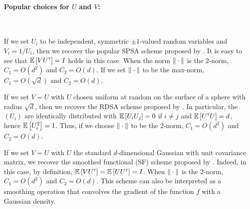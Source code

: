 \paragraph{Popular choices for $U$ and $V$:}\ \\
\begin{inparaenum}[$\bullet$]
 \item If we set $U_i$ to be independent, symmetric $\pm 1$-valued random variables and $V_i = 1/U_i$, then we recover the popular SPSA scheme proposed by \cite{spall1992multivariate}.
It is easy to see that $\mathbb{E}\left[  V U^\mathsf{\scriptscriptstyle T} \right] = I$ holds in this case.
 When the norm $\|\cdot\|$ is the $2$-norm, $C_1 = O(d^2)$ and $C_2 = O(d)$. If we set $\|\cdot\|$ to be the max-norm, $C_1 = O(\sqrt{d})$ and $C_2 = O(d)$.\\
 \item If we set $V=U$ with $U$ chosen uniform at random on the surface of a sphere with radius $\sqrt{d}$,
 then we recover the RDSA scheme proposed by  \citet[pp.~58--60]{kushcla}.
 In particular, the $(U_i)$ are identically distributed with $\mathbb{E}\left[ U_i U_j \right] = 0$ if $i\ne j$ and $\mathbb{E}\left[ U^\mathsf{\scriptscriptstyle T} U \right] = d$, hence $\mathbb{E}\left[U_i^2\right] = 1$. Thus, if we choose $\|\cdot\|$ to be the $2$-norm, $C_1 = O( d^2 )$ and $C_2 = O(d)$.\\
 \item If we set $V=U$ with $U$ the standard $d$-dimensional Gaussian with unit covariance matrix, we recover the smoothed functional (SF) scheme proposed by \cite{katkul}.
Indeed, in this case, by definition, $\mathbb{E}\left[VU^\mathsf{\scriptscriptstyle T}\right] = \mathbb{E}\left[U U^\mathsf{\scriptscriptstyle T} \right] = I$.
When $\|\cdot\|$ is the $2$-norm, $C_1 = O(d^2)$
 and $C_2 = O( d)$.
 This scheme can also be interpreted as a smoothing operation that  convolves the gradient of the function $f$ with a Gaussian density.
\end{inparaenum}


